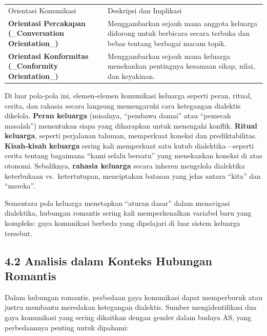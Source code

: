 \documentclass[
  letterpaper,
  DIV=11,
  numbers=noendperiod]{scrreprt}
\begin{document}
\begin{longtable}[]{@{}
  >{\raggedright\arraybackslash}p{}
  >{\raggedright\arraybackslash}p{}@{}}
\toprule\noalign{}
\endhead
\bottomrule\noalign{}
\endlastfoot
Orientasi Komunikasi & Deskripsi dan Implikasi \\
\textbf{Orientasi Percakapan (}\_\textbf{Conversation
Orientation}\_\textbf{)} & Menggambarkan sejauh mana anggota keluarga
didorong untuk berbicara secara terbuka dan bebas tentang berbagai macam
topik. \\
\textbf{Orientasi Konformitas (}\_\textbf{Conformity
Orientation}\_\textbf{)} & Menggambarkan sejauh mana keluarga menekankan
pentingnya kesamaan sikap, nilai, dan keyakinan. \\
\end{longtable}

Di luar pola-pola ini, elemen-elemen komunikasi keluarga seperti peran,
ritual, cerita, dan rahasia secara langsung memengaruhi cara ketegangan
dialektis dikelola. \textbf{Peran keluarga} (misalnya, ``pembawa damai''
atau ``pemecah masalah'') menentukan siapa yang diharapkan untuk
menengahi konflik. \textbf{Ritual keluarga}, seperti perjalanan tahunan,
memperkuat koneksi dan prediktabilitas. \textbf{Kisah-kisah keluarga}
sering kali memperkuat satu kutub dialektika---seperti cerita tentang
bagaimana ``kami selalu bersatu'' yang menekankan koneksi di atas
otonomi. Sebaliknya, \textbf{rahasia keluarga} secara inheren mengelola
dialektika keterbukaan vs.~ketertutupan, menciptakan batasan yang jelas
antara ``kita'' dan ``mereka''.

Sementara pola keluarga menetapkan ``aturan dasar'' dalam menavigasi
dialektika, hubungan romantis sering kali memperkenalkan variabel baru
yang kompleks: gaya komunikasi berbeda yang dipelajari di luar sistem
keluarga tersebut.

\subsection{\texorpdfstring{\textbf{4.2 Analisis dalam Konteks Hubungan
Romantis}}{4.2 Analisis dalam Konteks Hubungan Romantis}}\label{analisis-dalam-konteks-hubungan-romantis}

Dalam hubungan romantis, perbedaan gaya komunikasi dapat memperburuk
atau justru membantu meredakan ketegangan dialektis. Sumber
mengidentifikasi dua gaya komunikasi yang sering dikaitkan dengan gender
dalam budaya AS, yang perbedaannya penting untuk dipahami:
\end{document}
